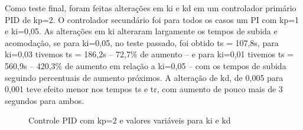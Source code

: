 \documentclass[a4paper,12pt]{article}
\begin{document}
Como teste final, foram feitas alterações em ki e kd em um controlador primário PID de kp=2. O controlador secundário foi para todos os casos um PI com kp=1 e ki=0,05. As alterações em ki alteraram largamente os tempos de subida e acomodação, se para ki=0,05, no teste passado, foi obtido ts = 107,8s, para ki=0,03 tivemos ts = 186,2s – 72,7\% de aumento – e para ki=0,01 tivemos ts = 560,9s – 420,3\% de aumento em relação a ki=0,05 – com os tempos de subida seguindo percentuais de aumento próximos. A alteração de kd, de 0,005 para 0,001 teve efeito menor nos tempos ts e tr, com aumento de pouco mais de 3 segundos para ambos.



\begin{figure}[H]
     \centering
\caption{Controle PID com kp=2 e valores variáveis para ki e kd}
     \label{fig:ControlePID2 com variação de ki e kd}
\end{figure}
\end{document}
